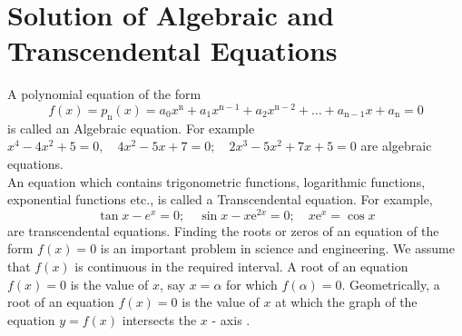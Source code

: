 \documentclass[12pt,a4paper,oneside]{book}
\begin{document}
\chapter{Solution of Algebraic and Transcendental Equations}
A polynomial equation of the form $$ f(x)=p_{\mathrm{n}}(x)=a_0 x^{\mathrm{n}}+a_1 x^{\mathrm{n}-1}+a_2 x^{\mathrm{n}-2}+\ldots+a_{\mathrm{n}-1} x+a_{\mathrm{n}}=0 $$ is called an Algebraic equation. For example $x^4-4 x^2+5=0,\quad 4 x^2-5 x+7=0 ;\quad 2 x^3-5 x^2+7 x+5=0$ are algebraic equations. \\
An equation which contains trigonometric functions, logarithmic functions, exponential functions etc., is called a Transcendental equation. For example, $$ \tan x-e^x=0 ; \quad  \sin x-x \mathrm{e}^{2 x}=0 ; \quad x \mathrm{e}^x=\cos x $$ are transcendental equations. Finding the roots or zeros of an equation of the form $f(x)=0$ is an important problem in science and engineering. We assume that $f(x)$ is continuous in the required interval. A root of an equation $f(x)=0$ is the value of $x$, say $x=\alpha$ for which $f(\alpha)=0$. Geometrically, a root of an equation $f(x)=0$ is the value of $x$ at which the graph of the equation $y=f(x)$ intersects the $x$ - axis .\\
\end{document}
